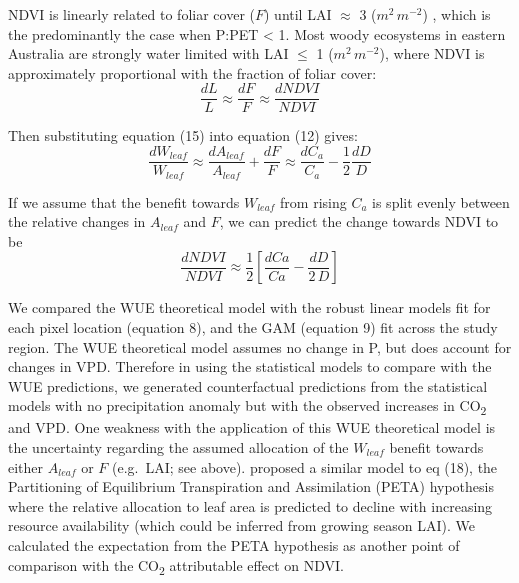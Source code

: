 \documentclass[gc, manuscript]{copernicus}
\begin{document}
NDVI is linearly related to foliar cover (\(F\)) until LAI \(\approx\) 3
(\(m^2\,m^{-2}\)) \citep{carlsonRelationNDVIFractional1997a}, which is
the predominantly the case when P:PET \textless{} 1. Most woody
ecosystems in eastern Australia are strongly water limited with LAI
\(\leq\) 1 (\(m^2\,m^{-2}\)), where NDVI is approximately proportional
with the fraction of foliar cover: \begin{equation}
\frac{dL}{L}\approx\frac{dF}{F}\approx\frac{d NDVI}{NDVI}
\end{equation}

Then substituting equation (15) into equation (12) gives:
\begin{equation}
\frac{dW_{leaf}}{W_{leaf}} \approx  \frac{dA_{leaf}}{A_{leaf}} + \frac{dF}{F} \approx \frac{dC_a}{C_a} - \frac{1}{2}\frac{dD}{D}
\end{equation}

If we assume that the benefit towards \(W_{leaf}\) from rising \(C_a\)
is split evenly between the relative changes in \(A_{leaf}\) and \(F\),
we can predict the change towards NDVI to be \begin{equation}
\frac{dNDVI}{NDVI} \approx \frac{1}{2}[\frac{dCa}{Ca}-\frac{dD}{2\,D}]
\end{equation}

We compared the WUE theoretical model with the robust linear models fit
for each pixel location (equation 8), and the GAM (equation 9) fit
across the study region. The WUE theoretical model assumes no change in
P, but does account for changes in VPD. Therefore in using the
statistical models to compare with the WUE predictions, we generated
counterfactual predictions from the statistical models with no
precipitation anomaly but with the observed increases in
CO\textsubscript{2} and VPD. One weakness with the application of this
WUE theoretical model is the uncertainty regarding the assumed
allocation of the \(W_{leaf}\) benefit towards either \(A_{leaf}\) or
\(F\) (e.g.~LAI; see above). \citet{donohue_etal17} proposed a similar
model to eq (18), the Partitioning of Equilibrium Transpiration and
Assimilation (PETA) hypothesis where the relative allocation to leaf
area is predicted to decline with increasing resource availability
(which could be inferred from growing season LAI). We calculated the
expectation from the PETA hypothesis as another point of comparison with
the CO\textsubscript{2} attributable effect on NDVI.
\end{document}
